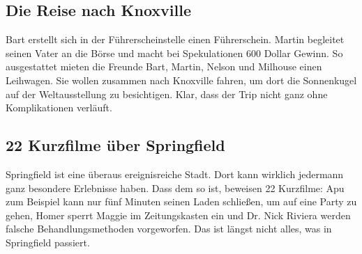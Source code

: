 	
\subsection{Die Reise nach Knoxville}\label{3F17}
Bart erstellt sich in der Führerscheinstelle einen Führerschein. Martin begleitet seinen Vater an die Börse und macht bei Spekulationen 600 Dollar Gewinn. So ausgestattet mieten die Freunde Bart, Martin, Nelson und Milhouse einen Leihwagen. Sie wollen zusammen nach Knoxville fahren, um dort die Sonnenkugel auf der Weltausstellung zu besichtigen. Klar, dass der Trip nicht ganz ohne Komplikationen verläuft.


	
\subsection{22 Kurzfilme über Springfield}\label{3F18}
Springfield ist eine überaus ereignisreiche Stadt. Dort kann wirklich jedermann ganz besondere Erlebnisse haben. Dass dem so ist, beweisen 22 Kurzfilme: Apu zum Beispiel kann nur fünf Minuten seinen Laden schließen, um auf eine Party zu gehen, Homer sperrt Maggie im Zeitungskasten ein und Dr. Nick Riviera werden falsche Behandlungsmethoden vorgeworfen. Das ist längst nicht alles, was in Springfield passiert.

